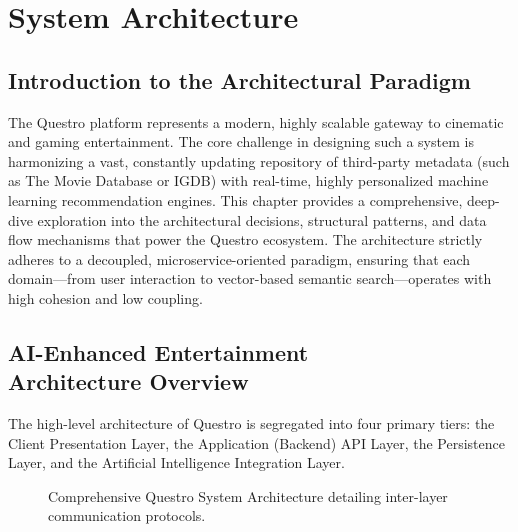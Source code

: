 \chapter{System Architecture}

\section{Introduction to the Architectural Paradigm}
The Questro platform represents a modern, highly scalable gateway to cinematic and gaming entertainment. The core challenge in designing such a system is harmonizing a vast, constantly updating repository of third-party metadata (such as The Movie Database or IGDB) with real-time, highly personalized machine learning recommendation engines. This chapter provides a comprehensive, deep-dive exploration into the architectural decisions, structural patterns, and data flow mechanisms that power the Questro ecosystem. The architecture strictly adheres to a decoupled, microservice-oriented paradigm, ensuring that each domain—from user interaction to vector-based semantic search—operates with high cohesion and low coupling.

\section[AI-Enhanced Entertainment Architecture Overview]{AI-Enhanced Entertainment\\ Architecture Overview}
The high-level architecture of Questro is segregated into four primary tiers: the Client Presentation Layer, the Application (Backend) API Layer, the Persistence Layer, and the Artificial Intelligence Integration Layer. 

\begin{figure}[H]
    \centering
    \caption{Comprehensive Questro System Architecture detailing inter-layer communication protocols.}
    \label{fig:system_architecture_detailed}
\end{figure}

